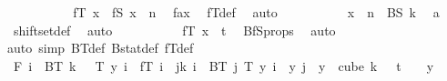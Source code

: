 \begin{isabellebody}
\ \ \ \ \ \ \ \isamarkupfalse%
\ \isamarkupfalse%
\ {\isachardoublequoteopen}fT\ x\ {\isacharequal}{\kern0pt}\ fS\ {\isacharparenleft}{\kern0pt}x\ {\isacharminus}{\kern0pt}\ n{\isacharparenright}{\kern0pt}{\isachardoublequoteclose}\ \isamarkupfalse%
\ fax{}\ \isamarkupfalse%
\ fT{\isacharunderscore}{\kern0pt}def\ \isamarkupfalse%
\ auto\isanewline
\ \ \ \ \ \ \ \isamarkupfalse%
\ \isamarkupfalse%
\ {\isachardoublequoteopen}x\ {\isacharminus}{\kern0pt}\ n\ {\isasymin}\ BS\ k{\isachardoublequoteclose}\ \isamarkupfalse%
\ a\ \isamarkupfalse%
\ shiftset{\isacharunderscore}{\kern0pt}def\ \isamarkupfalse%
\ auto\isanewline
\ \ \ \ \ \ \ \isamarkupfalse%
\ \isamarkupfalse%
\ {\isachardoublequoteopen}fT\ x\ {\isasymin}\ {\isacharbraceleft}{\kern0pt}{\isachardot}{\kern0pt}{\isachardot}{\kern0pt}{\isacharless}{\kern0pt}t{\isacharplus}{\kern0pt}{}{\isacharbraceright}{\kern0pt}{\isachardoublequoteclose}\ \isamarkupfalse%
\ BfS{\isacharunderscore}{\kern0pt}props\ \isamarkupfalse%
\ auto\isanewline
\ \ \ \ \ \isamarkupfalse%
\isanewline
\ \ \ \isamarkupfalse%
{\isacharparenleft}{\kern0pt}auto\ simp{\isacharcolon}{\kern0pt}\ BT{\isacharunderscore}{\kern0pt}def\ Bstat{\isacharunderscore}{\kern0pt}def\ fT{\isacharunderscore}{\kern0pt}def{\isacharparenright}{\kern0pt}\isanewline
\isanewline
\isanewline
\ \ \ \isamarkupfalse%
\ F{}{\isacharcolon}{\kern0pt}\ {\isachardoublequoteopen}{\isacharparenleft}{\kern0pt}{\isacharparenleft}{\kern0pt}{\isasymforall}i\ {\isasymin}\ BT\ {\isacharparenleft}{\kern0pt}k\ {\isacharplus}{\kern0pt}\ {}{\isacharparenright}{\kern0pt}{\isachardot}{\kern0pt}\ T\ y\ i\ {\isacharequal}{\kern0pt}\ fT\ i{\isacharparenright}{\kern0pt}\ {\isasymand}\ {\isacharparenleft}{\kern0pt}{\isasymforall}j{\isacharless}{\kern0pt}k{\isacharplus}{\kern0pt}{}{\isachardot}{\kern0pt}\ {\isasymforall}i\ {\isasymin}\ BT\ j{\isachardot}{\kern0pt}\ {\isacharparenleft}{\kern0pt}T\ y{\isacharparenright}{\kern0pt}\ i\ {\isacharequal}{\kern0pt}\ y\ j{\isacharparenright}{\kern0pt}{\isacharparenright}{\kern0pt}{\isachardoublequoteclose}\ \ {\isachardoublequoteopen}y\ {\isasymin}\ cube\ {\isacharparenleft}{\kern0pt}k\ {\isacharplus}{\kern0pt}\ {}{\isacharparenright}{\kern0pt}\ {\isacharparenleft}{\kern0pt}t\ {\isacharplus}{\kern0pt}\ {}{\isacharparenright}{\kern0pt}{\isachardoublequoteclose}\ \ y\isanewline

\end{isabellebody}
